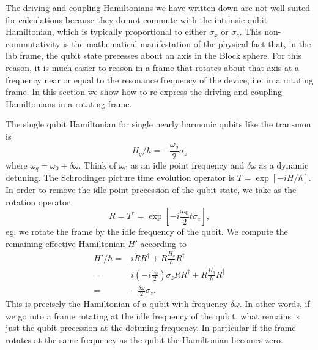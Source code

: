 
The driving and coupling Hamiltonians we have written down are not well suited for calculations because they do not commute with the intrinsic qubit Hamiltonian, which is typically proportional to either $\sigma_x$ or $\sigma_z$.
This non-commutativity is the mathematical manifestation of the physical fact that, in the lab frame, the qubit state precesses about an axis in the Block sphere.
For this reason, it is much easier to reason in a frame that rotates about that axis at a frequency near or equal to the resonance frequency of the device, i.e. in a rotating frame.
In this section we show how to re-express the driving and coupling Hamiltonians in a rotating frame.

The single qubit Hamiltonian for single nearly harmonic qubits like the transmon is \begin{equation}
H_q/\hbar = -\frac{\omega_q}{2}\sigma_z \end{equation}
where $\omega_q = \omega_0 + \delta\omega$. Think of $\omega_0$ as an idle point frequency and $\delta \omega$ as a dynamic detuning.
The Schrodinger picture time evolution operator is $T=\exp \left[-i H/\hbar \right]$.
In order to remove the idle point precession of the qubit state, we take as the rotation operator \begin{equation}
R = T^{\dagger} = \exp \left[ -i \frac{\omega_0}{2} t \sigma_z \right], \end{equation}
eg. we rotate the frame by the idle frequency of the qubit.
We compute the remaining effective Hamiltonian $H'$ according to 
\begin{align}
  H'/\hbar
  =& i\dot{R}R^{\dagger} + R \frac{H_q}{\hbar} R^\dagger \nonumber \\
  =& i \left(-i \frac{\omega_0}{2} \right)\sigma_z RR^{\dagger} + R\frac{H_q}{\hbar}R^{\dagger} \nonumber \\
  =& -\frac{\delta\omega}{2}\sigma_z.
\end{align}
This is precisely the Hamiltonian of a qubit with frequency $\delta\omega$.
In other words, if we go into a frame rotating at the idle frequency of the qubit, what remains is just the qubit precession at the detuning frequency.
In particular if the frame rotates at the same frequency as the qubit the Hamiltonian becomes zero.


